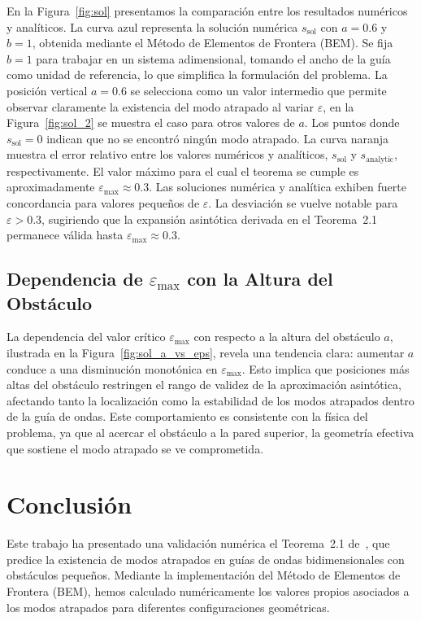 \documentclass[11pt]{article}
\begin{document}
En la Figura~\ref{fig:sol} presentamos la comparación entre los resultados numéricos y analíticos. La curva azul representa la solución numérica $s_{\text{sol}}$ con $a = 0.6$ y $b = 1$, obtenida mediante el Método de Elementos de Frontera (BEM). Se fija $b = 1$ para trabajar en un sistema adimensional, tomando el ancho de la guía como unidad de referencia, lo que simplifica la formulación del problema. La posición vertical $a = 0.6$ se selecciona como un valor intermedio que permite observar claramente la existencia del modo atrapado al variar $\varepsilon$, en la Figura~\ref{fig:sol_2} se muestra el caso para otros valores de $a$. Los puntos donde $s_{\text{sol}} = 0$ indican que no se encontró ningún modo atrapado. La curva naranja muestra el error relativo entre los valores numéricos y analíticos, $s_{\text{sol}}$ y $s_{\text{analytic}}$, respectivamente. El valor máximo para el cual el teorema se cumple es aproximadamente $\varepsilon_{\max} \approx 0.3$. Las soluciones numérica y analítica exhiben fuerte concordancia para valores pequeños de $\varepsilon$. La desviación se vuelve notable para $\varepsilon > 0.3$, sugiriendo que la expansión asintótica derivada en el Teorema~2.1 permanece válida hasta $\varepsilon_{\max} \approx 0.3$.

\subsection{Dependencia de $\varepsilon_{\max}$ con la Altura del Obstáculo}\label{subsec:eps_max_vs_a}

La dependencia del valor crítico $\varepsilon_{\max}$ con respecto a la altura del obstáculo $a$, ilustrada en la Figura~\ref{fig:sol_a_vs_eps}, revela una tendencia clara: aumentar $a$ conduce a una disminución monotónica en $\varepsilon_{\max}$. Esto implica que posiciones más altas del obstáculo restringen el rango de validez de la aproximación asintótica, afectando tanto la localización como la estabilidad de los modos atrapados dentro de la guía de ondas. Este comportamiento es consistente con la física del problema, ya que al acercar el obstáculo a la pared superior, la geometría efectiva que sostiene el modo atrapado se ve comprometida.

\section{Conclusión}\label{sec:conclusion}

Este trabajo ha presentado una validación numérica el Teorema~2.1 de~\cite{Zhevandrov2025}, que predice la existencia de modos atrapados en guías de ondas bidimensionales con obstáculos pequeños. Mediante la implementación del Método de Elementos de Frontera (BEM), hemos calculado numéricamente los valores propios asociados a los modos atrapados para diferentes configuraciones geométricas.
\end{document}
